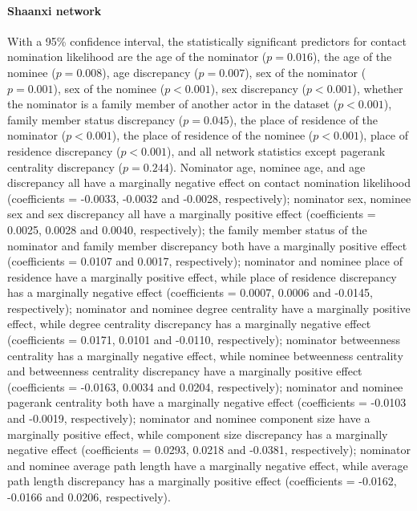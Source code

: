 \paragraph{Shaanxi network} With a 95\% confidence interval, the statistically significant predictors for contact nomination likelihood are the age of the nominator ($p=0.016$), the age of the nominee ($p=0.008$), age discrepancy ($p=0.007$), sex of the nominator ($p=0.001$), sex of the nominee ($p<0.001$), sex discrepancy ($p<0.001$), whether the nominator is a family member of another actor in the dataset ($p<0.001$), family member status discrepancy ($p=0.045$), the place of residence of the nominator ($p<0.001$), the place of residence of the nominee ($p<0.001$), place of residence discrepancy ($p<0.001$), and all network statistics except pagerank centrality discrepancy ($p=0.244$). Nominator age, nominee age, and age discrepancy all have a marginally negative effect on contact nomination likelihood (coefficients = -0.0033, -0.0032 and -0.0028, respectively); nominator sex, nominee sex and sex discrepancy all have a marginally positive effect (coefficients = 0.0025, 0.0028 and 0.0040, respectively); the family member status of the nominator and family member discrepancy both have a marginally positive effect (coefficients = 0.0107 and 0.0017, respectively); nominator and nominee place of residence have a marginally positive effect, while place of residence discrepancy has a marginally negative effect (coefficients = 0.0007, 0.0006 and -0.0145, respectively); nominator and nominee degree centrality have a marginally positive effect, while degree centrality discrepancy has a marginally negative effect (coefficients = 0.0171, 0.0101 and -0.0110, respectively); nominator betweenness centrality has a marginally negative effect, while nominee betweenness centrality and betweenness centrality discrepancy have a marginally positive effect (coefficients = -0.0163, 0.0034 and 0.0204, respectively); nominator and nominee pagerank centrality both have a marginally negative effect (coefficients = -0.0103 and -0.0019, respectively); nominator and nominee component size have a marginally positive effect, while component size discrepancy has a marginally negative effect (coefficients = 0.0293, 0.0218 and -0.0381, respectively); nominator and nominee average path length have a marginally negative effect, while average path length discrepancy has a marginally positive effect (coefficients = -0.0162, -0.0166 and 0.0206, respectively).

